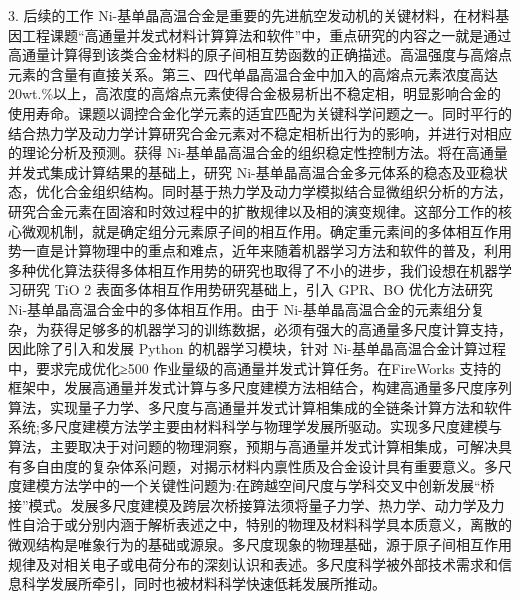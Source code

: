 3. 后续的工作
Ni-基单晶高温合金是重要的先进航空发动机的关键材料，在材料基因工程课题“高通量并发式材料计算算法和软件”中，重点研究的内容之一就是通过高通量计算得到该类合金材料的原子间相互势函数的正确描述。高温强度与高熔点元素的含量有直接关系。第三、四代单晶高温合金中加入的高熔点元素浓度高达 20wt.\%以上，高浓度的高熔点元素使得合金极易析出不稳定相，明显影响合金的使用寿命。课题以调控合金化学元素的适宜匹配为关键科学问题之一。同时平行的结合热力学及动力学计算研究合金元素对不稳定相析出行为的影响，并进行对相应的理论分析及预测。获得 Ni-基单晶高温合金的组织稳定性控制方法。将在高通量并发式集成计算结果的基础上，研究 Ni-基单晶高温合金多元体系的稳态及亚稳状态，优化合金组织结构。同时基于热力学及动力学模拟结合显微组织分析的方法，研究合金元素在固溶和时效过程中的扩散规律以及相的演变规律。这部分工作的核心微观机制，就是确定组分元素原子间的相互作用。确定重元素间的多体相互作用势一直是计算物理中的重点和难点，近年来随着机器学习方法和软件的普及，利用多种优化算法获得多体相互作用势的研究也取得了不小的进步，我们设想在机器学习研究 TiO 2 表面多体相互作用势研究基础上，引入 GPR、BO 优化方法研究 Ni-基单晶高温合金中的多体相互作用。由于 Ni-基单晶高温合金的元素组分复杂，为获得足够多的机器学习的训练数据，必须有强大的高通量多尺度计算支持，因此除了引入和发展 Python 的机器学习模块，针对 Ni-基单晶高温合金计算过程中，要求完成优化≥500 作业量级的高通量并发式计算任务。在FireWorks 支持的框架中，发展高通量并发式计算与多尺度建模方法相结合，构建高通量多尺度序列算法，实现量子力学、多尺度与高通量并发式计算相集成的全链条计算方法和软件系统;多尺度建模方法学主要由材料科学与物理学发展所驱动。实现多尺度建模与算法，主要取决于对问题的物理洞察，预期与高通量并发式计算相集成，可解决具有多自由度的复杂体系问题，对揭示材料内禀性质及合金设计具有重要意义。多尺度建模方法学中的一个关键性问题为:在跨越空间尺度与学科交叉中创新发展“桥接”模式。发展多尺度建模及跨层次桥接算法须将量子力学、热力学、动力学及力性自洽于或分别内涵于解析表述之中，特别的物理及材料科学具本质意义，离散的微观结构是唯象行为的基础或源泉。多尺度现象的物理基础，源于原子间相互作用规律及对相关电子或电荷分布的深刻认识和表述。多尺度科学被外部技术需求和信息科学发展所牵引，同时也被材料科学快速低耗发展所推动。

